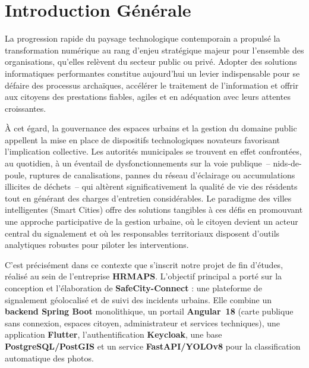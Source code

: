 
\chapter*{Introduction Générale}

La progression rapide du paysage technologique contemporain a propulsé la transformation numérique au rang d'enjeu stratégique majeur pour l'ensemble des organisations, qu'elles relèvent du secteur public ou privé. Adopter des solutions informatiques performantes constitue aujourd'hui un levier indispensable pour se défaire des processus archaïques, accélérer le traitement de l'information et offrir aux citoyens des prestations fiables, agiles et en adéquation avec leurs attentes croissantes.

À cet égard, la gouvernance des espaces urbains et la gestion du domaine public appellent la mise en place de dispositifs technologiques novateurs favorisant l'implication collective. Les autorités municipales se trouvent en effet confrontées, au quotidien, à un éventail de dysfonctionnements sur la voie publique~-- nids-de-poule, ruptures de canalisations, pannes du réseau d'éclairage ou accumulations illicites de déchets~-- qui altèrent significativement la qualité de vie des résidents tout en générant des charges d'entretien considérables. Le paradigme des villes intelligentes (Smart Cities) offre des solutions tangibles à ces défis en promouvant une approche participative de la gestion urbaine, où le citoyen devient un acteur central du signalement et où les responsables territoriaux disposent d'outils analytiques robustes pour piloter les interventions.

C'est précisément dans ce contexte que s'inscrit notre projet de fin d'études, réalisé au sein de l'entreprise \textbf{HRMAPS}. L'objectif principal a porté sur la conception et l'élaboration de \textbf{SafeCity-Connect} : une plateforme de signalement géolocalisé et de suivi des incidents urbains. Elle combine un \textbf{backend Spring Boot} monolithique, un portail \textbf{Angular~18} (carte publique sans connexion, espaces citoyen, administrateur et services techniques), une application \textbf{Flutter}, l'authentification \textbf{Keycloak}, une base \textbf{PostgreSQL/PostGIS} et un service \textbf{FastAPI/YOLOv8} pour la classification automatique des photos.

